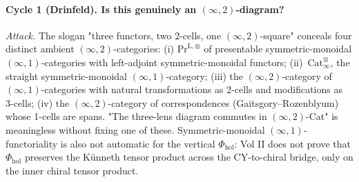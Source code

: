 

\paragraph*{Cycle 1 (Drinfeld). Is this genuinely an $(\infty,2)$-diagram?}

\emph{Attack.} The slogan "three functors, two 2-cells, one
$(\infty,2)$-square" conceals four distinct ambient
$(\infty,2)$-categories: (i) $\mathrm{Pr}^{\mathrm{L},\otimes}$ of
presentable symmetric-monoidal $(\infty,1)$-categories with left-adjoint
symmetric-monoidal functors; (ii)~$\mathrm{Cat}^{\otimes}_\infty$, the
straight symmetric-monoidal $(\infty,1)$-category; (iii) the
$(\infty,2)$-category of $(\infty,1)$-categories with natural
transformations as 2-cells and modifications as 3-cells; (iv) the
$(\infty,2)$-category of correspondences (Gaitsgory--Rozenblyum) whose
1-cells are spans. "The three-lens diagram commutes in
$(\infty,2)$-Cat" is meaningless without fixing one of these.
Symmetric-monoidal $(\infty,1)$-functoriality is also not automatic for
the vertical $\Phi_{\mathrm{hol}}$: Vol II does not prove that
$\Phi_{\mathrm{hol}}$ preserves the K\"unneth tensor product across the
CY-to-chiral bridge, only on the inner chiral tensor product.

